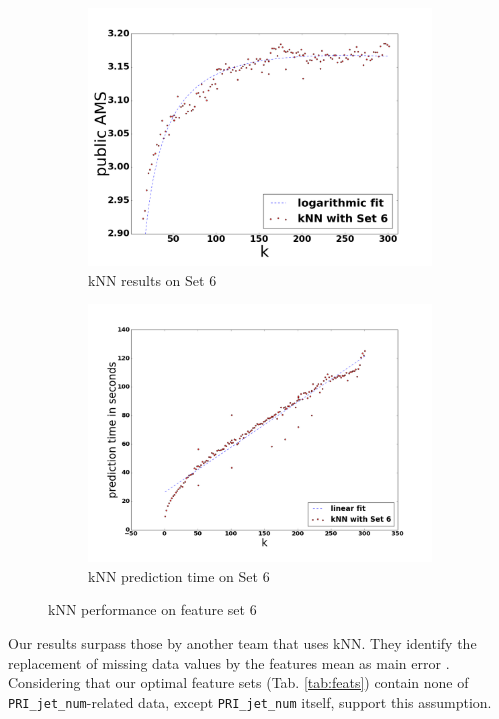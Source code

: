 \begin{figure}
	\centering
	\begin{subfigure}[b]{0.49\textwidth}
		\includegraphics[trim=0 0 0 20,clip,width=\textwidth]{images/knn_ams}
        \caption{kNN results on Set 6}
        \label{fig:knnams}
	\end{subfigure}
	\begin{subfigure}[b]{0.49\textwidth}
		\includegraphics[trim=20 0 0 0,clip,width=\textwidth]{images/knn_speed}
        \caption{kNN prediction time on Set 6}
        \label{fig:knnspeed}
	\end{subfigure}
	\caption{kNN performance on feature set 6}
	\label{fig:knn_perf}
\end{figure}

Our results surpass those by another team that uses kNN. They identify the replacement of missing data values by the features mean as main error \cite{california}. Considering that our optimal feature sets (Tab. \ref{tab:feats}) contain none of \texttt{PRI\_jet\_num}-related data, except \texttt{PRI\_jet\_num} itself, support this assumption.
